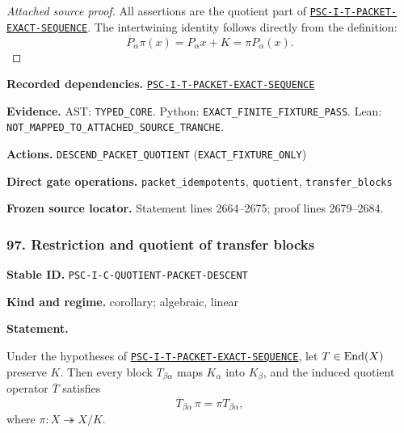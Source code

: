 \documentclass[a4paper,11pt]{article}
\newcommand{\field}[2]{\noindent\textbf{#1.} #2\par}
\begin{document}
\begin{proof}[Attached source proof]
All assertions are the quotient part of \hyperref[rec:PSC-I-T-PACKET-EXACT-SEQUENCE]{\nolinkurl{PSC-I-T-PACKET-EXACT-SEQUENCE}}.  The intertwining identity follows directly from the definition:
\[
\overline P_\alpha\pi(x)=P_\alpha x+K=\pi P_\alpha(x).
\]
\end{proof}
\field{Recorded dependencies}{\hyperref[rec:PSC-I-T-PACKET-EXACT-SEQUENCE]{\nolinkurl{PSC-I-T-PACKET-EXACT-SEQUENCE}}}
\field{Evidence}{AST: \nolinkurl{TYPED_CORE}. Python: \nolinkurl{EXACT_FINITE_FIXTURE_PASS}. Lean: \nolinkurl{NOT_MAPPED_TO_ATTACHED_SOURCE_TRANCHE}.}
\field{Actions}{\nolinkurl{DESCEND_PACKET_QUOTIENT} (\nolinkurl{EXACT_FIXTURE_ONLY})}
\field{Direct gate operations}{\nolinkurl{packet_idempotents}, \nolinkurl{quotient}, \nolinkurl{transfer_blocks}}
\field{Frozen source locator}{Statement lines 2664--2675; proof lines 2679--2684.}
\subsubsection*{97. Restriction and quotient of transfer blocks}
\label{rec:PSC-I-C-QUOTIENT-PACKET-DESCENT}
\field{Stable ID}{\nolinkurl{PSC-I-C-QUOTIENT-PACKET-DESCENT}}
\field{Kind and regime}{corollary; algebraic, linear}
\textbf{Statement.}\par
Under the hypotheses of \hyperref[rec:PSC-I-T-PACKET-EXACT-SEQUENCE]{\nolinkurl{PSC-I-T-PACKET-EXACT-SEQUENCE}}, let $T\in\operatorname{End}(X)$ preserve $K$.  Then every block $T_{\beta\alpha}$ maps $K_\alpha$ into $K_\beta$, and the induced quotient operator $\overline T$ satisfies
\[
\boxed{
\overline T_{\beta\alpha}\,\pi
=
\pi T_{\beta\alpha},
}
\]
where $\pi:X\twoheadrightarrow X/K$.
\end{document}
